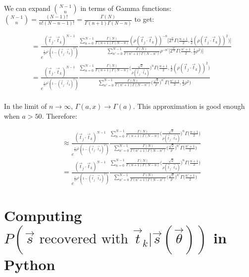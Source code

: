 \documentclass[12pt]{article}
\newcommand{\ptjtk}{\rho(\vec{t}_j\cdot\vec{t}_k)}
\newcommand{\tjtk}{(\vec{t}_j\cdot\vec{t}_k)}
\begin{document}
We can expand $\binom{N-1}{n}$ in terms of Gamma functions: $\binom{N-1}{n} = \frac{(N-1)!}{n!(N-n-1)!} = \frac{\Gamma(N)}{\Gamma(n+1)\Gamma(N-n)}$ to get:%

   \begin{align}
   &= \frac{\tjtk^{N-1}}{e^{\frac{1}{2}\rho^2(1-\tjtk^2)}} \frac{ \sum_{n=0}^{N-1} \frac{\Gamma(N)}{\Gamma(n+1)\Gamma(N-n)} (\ptjtk)^{-n} \Big[ 2^{\frac{n}{2}}\Gamma\Big(\frac{n+1}{2},\frac{1}{2}(\ptjtk)^2\Big) \Big]} 
   { \sum_{n'=0}^{N-1} \frac{\Gamma(N)}{\Gamma(n'+1)\Gamma(N-n')} \rho^{-n'}  \Big[ 2^{\frac{n'}{2}}\Gamma\Big(\frac{n'+1}{2},\frac{1}{2}\rho^2\Big) \Big] } \\
   &= \frac{\tjtk^{N-1}}{e^{\frac{1}{2}\rho^2(1-\tjtk^2)}} \frac{ \sum_{n=0}^{N-1} \frac{\Gamma(N)}{\Gamma(n+1)\Gamma(N-n)} \Big(\frac{\sqrt{2}}{\ptjtk}\Big)^{n} \Gamma\Big(\frac{n+1}{2},\frac{1}{2}(\ptjtk)^2\Big) } 
   { \sum_{n'=0}^{N-1} \frac{\Gamma(N)}{\Gamma(n'+1)\Gamma(N-n')} \Big(\frac{\sqrt{2}}{\rho}\Big)^{n'} \Gamma\Big(\frac{n'+1}{2},\frac{1}{2}\rho^2\Big) } \\
   \end{align}
  
In the limit of $n \rightarrow \infty$, $\Gamma(a,x) \rightarrow \Gamma(a)$. This approximation is good enough when $a > 50$. Therefore:
   
   \begin{align}
   &\approx \frac{\tjtk^{N-1}}{e^{\frac{1}{2}\rho^2(1-\tjtk^2)}} \frac{ \sum_{n=0}^{N-1} \frac{\Gamma(N)}{\Gamma(n+1)\Gamma(N-n)} \Big(\frac{\sqrt{2}}{\ptjtk}\Big)^{n} \Gamma\Big(\frac{n+1}{2}\Big) } 
   { \sum_{n'=0}^{N-1} \frac{\Gamma(N)}{\Gamma(n'+1)\Gamma(N-n')} \Big(\frac{\sqrt{2}}{\rho}\Big)^{n'} \Gamma\Big(\frac{n'+1}{2}\Big) } \\
   &= \frac{\tjtk^{N-1}}{e^{\frac{1}{2}\rho^2(1-\tjtk^2)}} \frac{ \sum_{n=0}^{N-1} \frac{\Gamma(N)}{\Gamma(n+1)\Gamma(N-n)} \Big(\frac{\sqrt{2}}{\ptjtk}\Big)^{n} \Gamma\Big(\frac{n+1}{2}\Big) } 
   { \sum_{n'=0}^{N-1} \frac{\Gamma(N)}{\Gamma(n'+1)\Gamma(N-n')} \Big(\frac{\sqrt{2}}{\rho}\Big)^{n'} \Gamma\Big(\frac{n'+1}{2}\Big) }
   \end{align}
   
\section{Computing $P(\text{$\vec{s}$ recovered with $\vec{t}_k$}|\vec{s}(\vec\theta))$ in Python}
   
\end{document}
